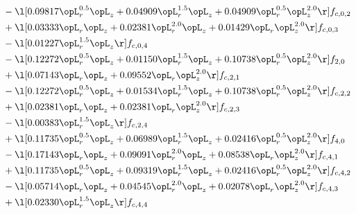 \begin{alignat}{2}
& - \l[  0.09817 \opL_r^{0.5} \opL_z +  0.04909 \opL_r^{1.5} \opL_z +  0.04909 \opL_r^{0.5} \opL_z^{2.0}  \r] f_{c,0,2} \nonumber \\ 
& + \l[  0.03333 \opL_r \opL_z +  0.02381 \opL_r^{2.0} \opL_z +  0.01429 \opL_r \opL_z^{2.0}  \r] f_{c,0,3} \nonumber \\ 
& - \l[  0.01227 \opL_r^{1.5} \opL_z  \r] f_{c,0,4} \nonumber \\ 
& - \l[  0.12272 \opL_r^{0.5} \opL_z +  0.01150 \opL_r^{1.5} \opL_z +  0.10738 \opL_r^{0.5} \opL_z^{2.0}  \r] f_{2,0} \nonumber \\ 
& + \l[  0.07143 \opL_r \opL_z +  0.09552 \opL_r \opL_z^{2.0}  \r] f_{c,2,1} \nonumber \\ 
& - \l[  0.12272 \opL_r^{0.5} \opL_z +  0.01534 \opL_r^{1.5} \opL_z +  0.10738 \opL_r^{0.5} \opL_z^{2.0}  \r] f_{c,2,2} \nonumber \\ 
& + \l[  0.02381 \opL_r \opL_z +  0.02381 \opL_r \opL_z^{2.0}  \r] f_{c,2,3} \nonumber \\ 
& - \l[  0.00383 \opL_r^{1.5} \opL_z  \r] f_{c,2,4} \nonumber \\ 
& + \l[  0.11735 \opL_r^{0.5} \opL_z +  0.06989 \opL_r^{1.5} \opL_z +  0.02416 \opL_r^{0.5} \opL_z^{2.0}  \r] f_{4,0} \nonumber \\ 
& - \l[  0.17143 \opL_r \opL_z +  0.09091 \opL_r^{2.0} \opL_z +  0.08538 \opL_r \opL_z^{2.0}  \r] f_{c,4,1} \nonumber \\ 
& + \l[  0.11735 \opL_r^{0.5} \opL_z +  0.09319 \opL_r^{1.5} \opL_z +  0.02416 \opL_r^{0.5} \opL_z^{2.0}  \r] f_{c,4,2} \nonumber \\ 
& - \l[  0.05714 \opL_r \opL_z +  0.04545 \opL_r^{2.0} \opL_z +  0.02078 \opL_r \opL_z^{2.0}  \r] f_{c,4,3} \nonumber \\ 
& + \l[  0.02330 \opL_r^{1.5} \opL_z  \r] f_{c,4,4} \nonumber \\ 
\end{alignat} 


